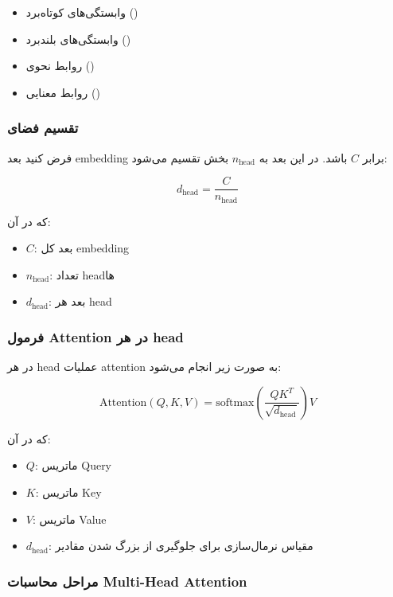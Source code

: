 \documentclass{article}
\begin{document}
\begin{itemize}
	\item وابستگی‌های کوتاه‌برد ()
	\item وابستگی‌های بلندبرد ()
	\item روابط نحوی ()
	\item روابط معنایی ()
\end{itemize}

\subsubsection*{تقسیم فضای }

فرض کنید بعد embedding برابر \( C \) باشد. در  این بعد به \( n_{\text{head}} \) بخش تقسیم می‌شود:

\[
d_{\text{head}} = \frac{C}{n_{\text{head}}}
\]

که در آن:

\begin{itemize}
	\item \( C \): بعد کل embedding
	\item \( n_{\text{head}} \): تعداد headها
	\item \( d_{\text{head}} \): بعد هر head
\end{itemize}

\subsubsection*{فرمول Attention در هر head}

در هر head عملیات attention به صورت زیر انجام می‌شود:

\[
\text{Attention}(Q, K, V) =
\text{softmax}\left(
\frac{QK^{T}}{\sqrt{d_{\text{head}}}}
\right)V
\]

که در آن:

\begin{itemize}
	\item \( Q \): ماتریس Query
	\item \( K \): ماتریس Key
	\item \( V \): ماتریس Value
	\item \( d_{\text{head}} \): مقیاس نرمال‌سازی برای جلوگیری از بزرگ شدن مقادیر
\end{itemize}

\subsubsection*{مراحل محاسبات Multi-Head Attention}
\end{document}

